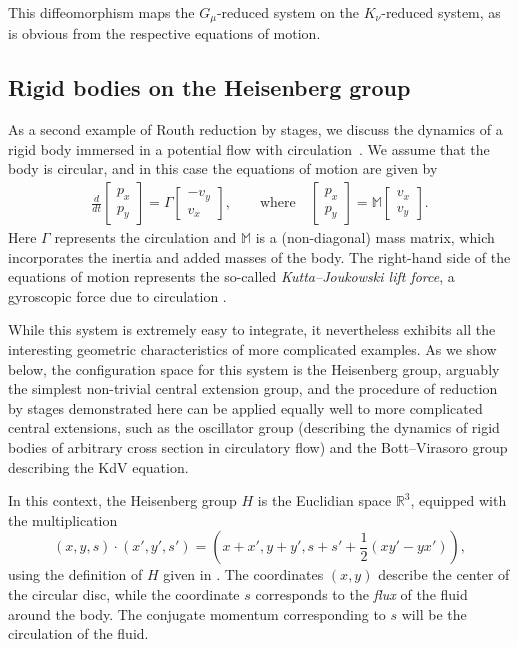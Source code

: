 \documentclass[pdftex]{sigma}
\begin{document}
This dif\/feomorphism maps the $G_\mu$-reduced system on the
$K_\nu$-reduced system, as is obvious from the respective equations of motion.


\subsection{Rigid bodies on the Heisenberg group}\label{section7.2}

As a second example of Routh reduction by stages, we discuss the dynamics of a rigid body immersed in a potential f\/low with circulation~\cite{VaKaMa2009b}.   We assume that the body is circular, and in this case the equations of motion are given by
\begin{gather} \label{circeqns}
	\frac{d}{dt}
		\begin{bmatrix}
			p_x \\ p_y
		\end{bmatrix} = \Gamma
			\begin{bmatrix}
				- v_y \\
				v_x
			\end{bmatrix},
	\qquad \text{where}\quad
	\begin{bmatrix}
			p_x \\ p_y
		\end{bmatrix} = \mathbb{M}
	\begin{bmatrix}
			v_x \\ v_y
		\end{bmatrix}.
\end{gather}
Here $\Gamma$ represents the circulation and $\mathbb{M}$ is a (non-diagonal) mass matrix, which incorporates the inertia and added masses of the body.  The right-hand side  of the equations of motion represents the so-called \emph{Kutta--Joukowski lift force}, a gyroscopic force due to circulation \cite{lamb, MiTh1968}.


While this system is extremely easy to integrate, it nevertheless exhibits all the interesting geometric characteristics of more complicated examples.  As we show below, the conf\/iguration space for this system is the Heisenberg group, arguably the simplest non-trivial central extension group, and the procedure of reduction by stages demonstrated here can be applied equally well to more complicated central extensions, such as the oscillator group (describing the dynamics of rigid bodies of arbitrary cross section in circulatory f\/low) and the Bott--Virasoro group describing the KdV equation.

In this context, the Heisenberg group $H$ is the Euclidian space $\mathbb{R}^3$, equipped with the multiplication
\[
	(x, y, s) \cdot (x', y', s') = \left(x + x', y + y', s + s' + \frac{1}{2} (xy' - yx')\right),
\]
using the def\/inition of $H$ given in \cite{Montboek}.  The coordinates $(x, y)$ describe the center of the circular disc, while the coordinate $s$ corresponds to the \emph{flux} of the f\/luid around the body.  The conjugate momentum corresponding to $s$ will be the circulation of the f\/luid.
\end{document}
